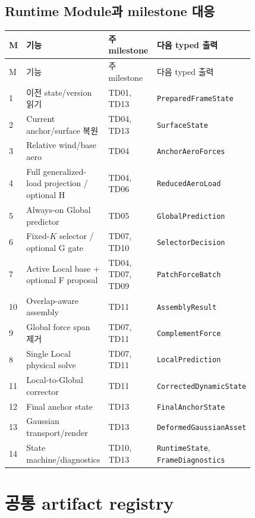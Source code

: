 \documentclass[10pt,a4paper]{article}
\newcommand{\code}[1]{\texttt{#1}}
\begin{document}
\normalsize

\subsection{Runtime Module과 milestone 대응}

\begin{longtable}{L{0.05\linewidth}L{0.27\linewidth}L{0.21\linewidth}L{0.29\linewidth}}
\toprule
M & 기능 & 주 milestone & 다음 typed 출력 \\
\midrule
\endfirsthead
\toprule
M & 기능 & 주 milestone & 다음 typed 출력 \\
\midrule
{} & 이전 state/version 읽기 & TD01, TD13 & \code{PreparedFrameState} \\
2 & Current anchor/surface 복원 & TD04, TD13 & \code{SurfaceState} \\
3 & Relative wind/base aero & TD04 & \code{AnchorAeroForces} \\
4 & Full generalized-load projection / optional H & TD04, TD06 & \code{ReducedAeroLoad} \\
5 & Always-on Global predictor & TD05 & \code{GlobalPrediction} \\
6 & Fixed-\(K\) selector / optional G gate & TD07, TD10 & \code{SelectorDecision} \\
7 & Active Local base + optional F proposal & TD04, TD07, TD09 & \code{PatchForceBatch} \\
10 & Overlap-aware assembly & TD11 & \code{AssemblyResult} \\
9 & Global force span 제거 & TD07, TD11 & \code{ComplementForce} \\
8 & Single Local physical solve & TD07, TD11 & \code{LocalPrediction} \\
11 & Local-to-Global corrector & TD11 & \code{CorrectedDynamicState} \\
12 & Final anchor state & TD13 & \code{FinalAnchorState} \\
13 & Gaussian transport/render & TD13 & \code{DeformedGaussianAsset} \\
14 & State machine/diagnostics & TD10, TD13 & \code{RuntimeState}, \code{FrameDiagnostics} \\
\bottomrule
\end{longtable}

\section{공통 artifact registry}
\end{document}
